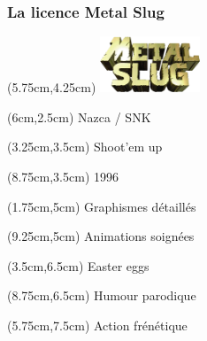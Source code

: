 \begin{frame}

	\frametitle{La licence Metal Slug}
	
	\begin{textblock*}{3cm}(5.75cm,4.25cm)
		\includegraphics[width=3cm]{figures/logo_metal_slug.png}
	\end{textblock*}
	
	{
		\begin{textblock*}{5cm}(6cm,2.5cm)
			Nazca / SNK
		\end{textblock*}
		\begin{textblock*}{5cm}(3.25cm,3.5cm)
			Shoot'em up
		\end{textblock*}
		\begin{textblock*}{5cm}(8.75cm,3.5cm)
			1996
		\end{textblock*}
		\begin{textblock*}{5cm}(1.75cm,5cm)
			Graphismes détaillés
		\end{textblock*}
		\begin{textblock*}{5cm}(9.25cm,5cm)
			Animations soignées
		\end{textblock*}
		\begin{textblock*}{5cm}(3.5cm,6.5cm)
			Easter eggs
		\end{textblock*}
		\begin{textblock*}{5cm}(8.75cm,6.5cm)
			Humour parodique
		\end{textblock*}
		\begin{textblock*}{5cm}(5.75cm,7.5cm)
			Action frénétique
		\end{textblock*}
	}
	
\end{frame}
